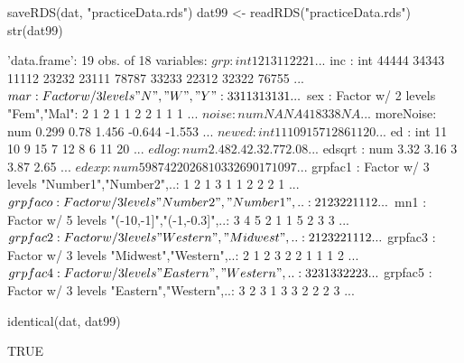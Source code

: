 \begin{Schunk}
\begin{Sinput}
  saveRDS(dat, "practiceData.rds")
  dat99 <- readRDS("practiceData.rds")
  str(dat99)
\end{Sinput}
\begin{Soutput}
'data.frame':	19 obs. of  18 variables:
 $ grp      : int  1 2 1 3 1 1 2 2 2 1 ...
 $ inc      : int  44444 34343 11112 23232 23111 78787 33233 22312 32322 76755 ...
 $ mar      : Factor w/ 3 levels "N","W","Y": 3 3 1 1 3 1 3 1 3 1 ...
 $ sex      : Factor w/ 2 levels "Fem","Mal": 2 1 2 1 1 2 2 1 1 1 ...
 $ noise    : num  NA NA 418 338 NA ...
 $ moreNoise: num  0.299 0.78 1.456 -0.644 -1.553 ...
 $ newed    : int  11 10 9 15 7 12 8 6 11 20 ...
 $ ed       : int  11 10 9 15 7 12 8 6 11 20 ...
 $ edlog    : num  2.48 2.4 2.3 2.77 2.08 ...
 $ edsqrt   : num  3.32 3.16 3 3.87 2.65 ...
 $ edexp    : num  59874 22026 8103 3269017 1097 ...
 $ grpfac1  : Factor w/ 3 levels "Number1","Number2",..: 1 2 1 3 1 1 2 2 2 1 ...
 $ grpfaco  : Factor w/ 3 levels "Number2","Number1",..: 2 1 2 3 2 2 1 1 1 2 ...
 $ mn1      : Factor w/ 5 levels "(-10,-1]","(-1,-0.3]",..: 3 4 5 2 1 1 5 2 3 3 ...
 $ grpfac2  : Factor w/ 3 levels "Western","Midwest",..: 2 1 2 3 2 2 1 1 1 2 ...
 $ grpfac3  : Factor w/ 3 levels "Midwest","Western",..: 2 1 2 3 2 2 1 1 1 2 ...
 $ grpfac4  : Factor w/ 3 levels "Eastern","Western",..: 3 2 3 1 3 3 2 2 2 3 ...
 $ grpfac5  : Factor w/ 3 levels "Eastern","Western",..: 3 2 3 1 3 3 2 2 2 3 ...
\end{Soutput}
\begin{Sinput}
  identical(dat, dat99)
\end{Sinput}
\begin{Soutput}
[1] TRUE
\end{Soutput}
\end{Schunk}
